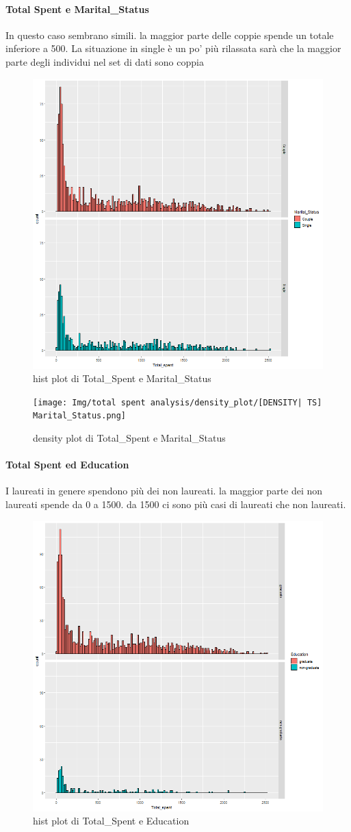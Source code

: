 \documentclass[letterpaper,11pt]{article}
\begin{document}
\paragraph{Total Spent e Marital\_Status}
In questo caso sembrano simili. la maggior parte delle coppie spende un totale inferiore a 500.
La situazione in single è un po' più rilassata sarà che la maggior parte degli individui
 nel set di dati sono coppia



\begin{figure}[h!]
    \centering
    \includegraphics[width=.5\textwidth]{Img/EDA/EDA028.png}
    \caption{hist plot di Total\_Spent e Marital\_Status }
\end{figure}




\begin{figure}[h!]
    \centering
    \texttt{[image: Img/total spent analysis/density\_plot/[DENSITY| TS] Marital\_Status.png]}
    \caption{density plot di Total\_Spent e Marital\_Status }
\end{figure}

\paragraph{Total Spent ed Education}
I laureati in genere spendono più dei non laureati. la maggior parte dei non laureati spende da 0 a 1500. da 1500 ci sono più casi di laureati che non laureati.

\begin{figure}[h!]
    \centering
    \includegraphics[width=.5\textwidth]{Img/EDA/EDA030.png}
    \caption{hist plot di Total\_Spent e Education}
\end{figure}
\end{document}
